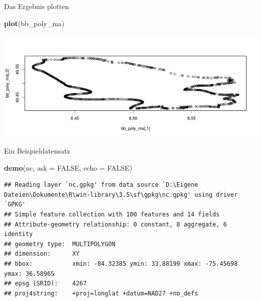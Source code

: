 \documentclass[ignorenonframetext,]{beamer}
\newenvironment{Shaded}{\begin{snugshade}}{\end{snugshade}}
\newcommand{\DataTypeTok}[1]{\textcolor[rgb]{0.13,0.29,0.53}{#1}}
\newcommand{\KeywordTok}[1]{\textcolor[rgb]{0.13,0.29,0.53}{\textbf{#1}}}
\newcommand{\NormalTok}[1]{#1}
\newcommand{\OtherTok}[1]{\textcolor[rgb]{0.56,0.35,0.01}{#1}}
\begin{document}
\begin{frame}[fragile]{Das Ergebnis plotten}
\protect\hypertarget{das-ergebnis-plotten}{}

\begin{Shaded}
\begin{Highlighting}[]
\KeywordTok{plot}\NormalTok{(bb_poly_ma)}
\end{Highlighting}
\end{Shaded}

\includegraphics{B7_simplefeatures_files/figure-beamer/unnamed-chunk-6-1.pdf}

\end{frame}

\begin{frame}[fragile]{Ein Beispieldatensatz}
\protect\hypertarget{ein-beispieldatensatz}{}

\begin{Shaded}
\begin{Highlighting}[]
\KeywordTok{demo}\NormalTok{(nc, }\DataTypeTok{ask =} \OtherTok{FALSE}\NormalTok{, }\DataTypeTok{echo =} \OtherTok{FALSE}\NormalTok{)}
\end{Highlighting}
\end{Shaded}

\begin{verbatim}
## Reading layer `nc.gpkg' from data source `D:\Eigene Dateien\Dokumente\R\win-library\3.5\sf\gpkg\nc.gpkg' using driver `GPKG'
## Simple feature collection with 100 features and 14 fields
## Attribute-geometry relationship: 0 constant, 8 aggregate, 6 identity
## geometry type:  MULTIPOLYGON
## dimension:      XY
## bbox:           xmin: -84.32385 ymin: 33.88199 xmax: -75.45698 ymax: 36.58965
## epsg (SRID):    4267
## proj4string:    +proj=longlat +datum=NAD27 +no_defs
\end{verbatim}

\end{frame}
\end{document}
